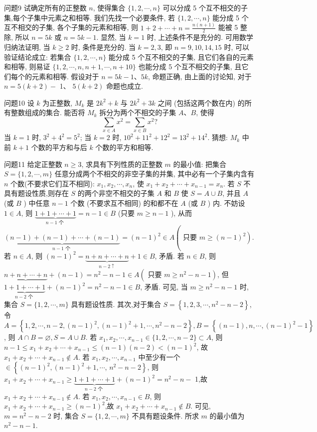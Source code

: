 问题9 试确定所有的正整数 $n$, 使得集合 $\{1,2, \cdots, n\}$ 可以分成 5 个互不相交的子集,每个子集中元素之和相等.
我们先找一个必要条件, 若 $\{1,2, \cdots, n\}$ 能分成 5 个互不相交的子集, 各个子集的元素和相等, 则 $1+2+\cdots+n=\frac{n(n+1)}{2}$ 能被 5 整除, 所以 $n=5 k$ 或 $n=5 k-1$. 显然, 当 $k=1$ 时, 上述条件不是充分的.
可用数学归纳法证明, 当 $k \geqslant 2$ 时, 条件是充分的.
当 $k=2,3$, 即 $n=9,10,14,15$ 时, 可以验证结论成立:
若集合 $\{1,2, \cdots, n\}$ 能分成 5 个互不相交的子集, 且它们各自的元素和相等, 则易证 $\{1,2, \cdots, n, n+1, \cdots, n+10\}$ 也能分成 5 个互不相交的子集, 且它们每个的元素和相等.
假设对于 $n=5 k-1 、 5 k$, 命题正确, 由上面的讨论知, 对于 $n=5(k+2)-$ 1、 $5(k+2)$ 命题也成立.



问题10 设 $k$ 为正整数, $M_k$ 是 $2 k^2+k$ 与 $2 k^2+3 k$ 之间 (包括这两个数在内) 的所有整数组成的集合.
能否将 $M_k$ 拆分为两个不相交的子集 $A 、 B$, 使得
$$
\sum_{x \in A} x^2=\sum_{x \in B} x^2 ?
$$
当 $k=1$ 时, $3^2+4^2=5^2$; 当 $k=2$ 时, $10^2+11^2+12^2=13^2+14^2$. 猜想: $M_k$ 中前 $k+1$ 个数的平方和与后 $k$ 个数的平方和相等.



问题11 给定正整数 $n \geqslant 3$, 求具有下列性质的正整数 $m$ 的最小值: 把集合 $S= \{1,2, \cdots, m\}$ 任意分成两个不相交的非空子集的并集, 其中必有一个子集内含有 $n$ 个数(不要求它们互不相同): $x_1, x_2, \cdots, x_n$, 使 $x_1+x_2+\cdots+x_{n-1}=x_n$.
若 $S$ 不具有题设性质,则存在 $S$ 的两个非空不相交的子集 $A$ 和 $B$ 使 $S=A \cup B$, 并且 $A$ (或 $B$ ) 中任意 $n-1$ 个数 (不要求互不相同) 的和都不在 $A$ (或 $B$ ) 内.
不妨设 $1 \in A$, 则 $\underbrace{1+1+\cdots+1}_{n-1 \text { 个 }}=n-1 \in B$ (只要 $m \geqslant n-1$ ), 从而 $\underbrace{(n-1)+(n-1)+\cdots+(n-1)}_{n-1 \text { 个 }}=(n-1)^2 \in A\left(\right.$ 只要 $\left.m \geqslant(n-1)^2\right)$. 若 $n \in A$, 则 $(n-1)^2=\underbrace{n+n+\cdots+n}_{n-2 \uparrow}+1 \in B$, 矛盾.
若 $n \in B$, 则 $\underbrace{n+n+\cdots+n}+ (n-1)=n^2-n-1 \in A\left(\right.$ 只要 $\left.m \geqslant n^2-n-1\right)$, 但 $\underbrace{1+1+\cdots+1}_{n-2 \text { 个 }}+(n-1)^2= n^2-n-1 \in B$, 矛盾.
可见, 当 $m \geqslant n^2-n-1$ 时, 集合 $S=\{1,2, \cdots, m\}$ 具有题设性质.
其次,对于集合 $S=\left\{1,2,3, \cdots, n^2-n-2\right\}$, 令 $A=\left\{1,2, \cdots, n-2, (n-1)^2,(n-1)^2+1, \cdots, n^2-n-2\right\}, B=\left\{(n-1), n, \cdots,(n-1)^2-1\right\}$, 则 $A \cap B=\varnothing, S=A \cup B$. 若 $x_1, x_2, \cdots, x_{n-1} \in\{1,2, \cdots, n-2\} \subset A$, 则 $n-1 \leqslant x_1+x_2+\cdots+x_{n-1} \leqslant(n-1)(n-2)<(n-1)^2$, 故 $x_1+x_2+\cdots+ x_{n-1} \notin A$. 若 $x_1, x_2, \cdots, x_{n-1}$ 中至少有一个 $\in\left\{(n-1)^2,(n-1)^2+1, \cdots\right.$, $\left.n^2-n-2\right\}$, 则 $x_1+x_2+\cdots+x_{n-1} \geqslant \underbrace{1+1+\cdots+1}_{n-2 \text { 个 }}+(n-1)^2=n^2-n-$ 1,故 $x_1+x_2+\cdots+x_{n-1} \notin A$. 若 $x_1, x_2, \cdots, x_{n-1} \in B$, 则 $x_1+x_2+\cdots+ x_{n-1} \geqslant(n-1)^2$,故 $x_1+x_2+\cdots+x_{n-1} \notin B$. 可见, $m=n^2-n-2$ 时, 集合 $S=\{1,2, \cdots, m\}$ 不具有题设条件.
所求 $m$ 的最小值为 $n^2-n-1$.



